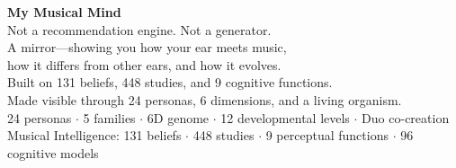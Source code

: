 \documentclass[10pt,a4paper]{article}
\begin{document}
\begin{tcolorbox}[
  enhanced, colback=deep!3, colframe=deep!15,
  boxrule=0.3pt, arc=4pt, left=14pt, right=14pt, top=10pt, bottom=10pt
]
\begin{center}
\sffamily\color{deep}
{\large\bfseries My Musical Mind}\\[6pt]

\small
Not a recommendation engine. Not a generator.\\
A mirror---showing you how your ear meets music,\\
how it differs from other ears, and how it evolves.\\[8pt]

Built on 131 beliefs, 448 studies, and 9 cognitive functions.\\
Made visible through 24 personas, 6 dimensions, and a living organism.\\[6pt]

{\footnotesize\color{stone}
24 personas $\cdot$ 5 families $\cdot$ 6D genome $\cdot$ 12 developmental levels $\cdot$ Duo co-creation\\[2pt]
Musical Intelligence: 131 beliefs $\cdot$ 448 studies $\cdot$ 9 perceptual functions $\cdot$ 96 cognitive models}
\end{center}
\end{tcolorbox}
\end{document}
